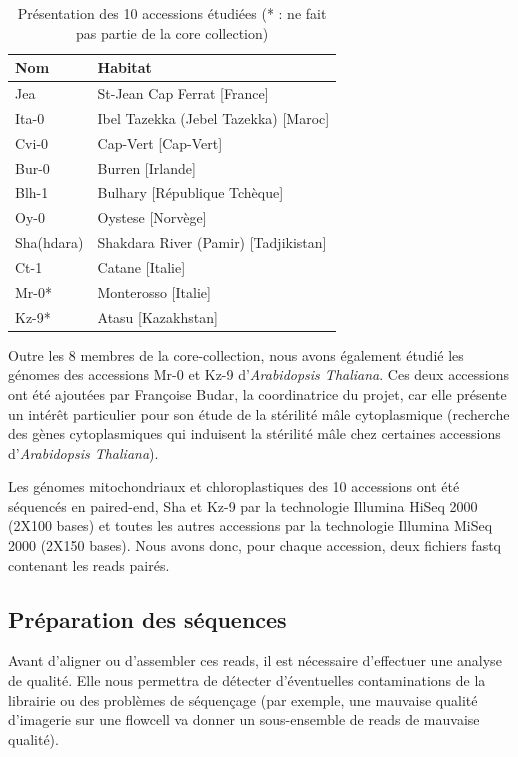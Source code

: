 \documentclass[a4paper]{article}
\begin{document}
\begin{table}[!ht]
\centering
\begin{tabular}{|l|l|}
\hline
   Nom & Habitat \\
   \hline
   Jea & St-Jean Cap Ferrat [France] \\
   Ita-0 & Ibel Tazekka (Jebel Tazekka) [Maroc] \\
   Cvi-0 & Cap-Vert [Cap-Vert] \\
   Bur-0 & Burren [Irlande] \\
   Blh-1 & Bulhary [République Tchèque] \\
   Oy-0 & Oystese [Norvège] \\
   Sha(hdara) & Shakdara River (Pamir) [Tadjikistan] \\
   Ct-1 & Catane [Italie] \\
   Mr-0* & Monterosso [Italie] \\
   Kz-9* & Atasu [Kazakhstan] \\
   \hline
\end{tabular}
\label{donnees}
\caption{Présentation des 10 accessions étudiées (* : ne fait pas partie de la core collection)}
\end{table}

Outre les 8 membres de la core-collection, nous avons également étudié les génomes des accessions Mr-0 et Kz-9 d'\textit{Arabidopsis Thaliana}. Ces deux accessions ont été ajoutées par Françoise Budar, la coordinatrice du projet, car elle présente un intérêt particulier pour son étude de la stérilité mâle cytoplasmique (recherche des gènes cytoplasmiques qui induisent la stérilité mâle chez certaines accessions d'\textit{Arabidopsis Thaliana}). 

Les génomes mitochondriaux et chloroplastiques des 10 accessions ont été séquencés en paired-end, Sha et Kz-9 par la technologie Illumina HiSeq 2000 (2X100 bases) et toutes les autres accessions par la technologie Illumina MiSeq 2000 (2X150 bases). Nous avons donc, pour chaque accession, deux fichiers fastq contenant les reads pairés. 

\subsection{Préparation des séquences}

Avant d'aligner ou d'assembler ces reads, il est nécessaire d'effectuer une analyse de qualité. Elle nous permettra de détecter d'éventuelles contaminations de la librairie ou des problèmes de séquençage (par exemple, une mauvaise qualité d'imagerie sur une flowcell va donner un sous-ensemble de reads de mauvaise qualité).
\end{document}
